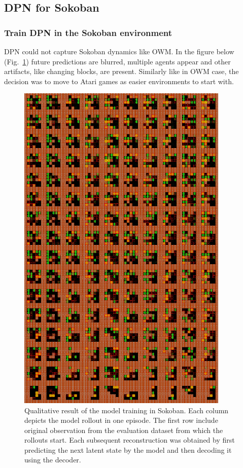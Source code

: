 \subsection{DPN for Sokoban}

\subsubsection{Train DPN in the Sokoban environment}

DPN could not capture Sokoban dynamics like OWM. In the figure below (Fig.~\ref{Fig.PlaNet_Sokoban_openloop}) future predictions are blurred, multiple agents appear and other artifacts, like changing blocks, are present. Similarly like in OWM case, the decision was to move to Atari games as easier environments to start with.

\begin{figure}[H]
\includegraphics[width=0.9\textwidth,keepaspectratio]{figures/PlaNet/Sokoban_memory.png}
\caption[Qualitative result of the PlaNet model training in Sokoban]{Qualitative result of the model training in Sokoban. Each column depicts the model rollout in one episode. The first row include original observation from the evaluation dataset from which the rollouts start. Each subsequent reconstruction was obtained by first predicting the next latent state by the model and then decoding it using the decoder.}
\label{Fig.PlaNet_Sokoban_openloop}
\end{figure}

